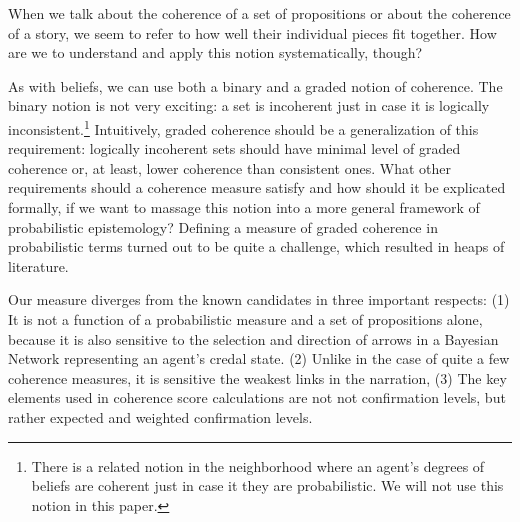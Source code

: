 \documentclass[10pt,]{scrartcl}
\begin{document}

When we talk about the coherence of a set of propositions or about the
coherence of a story, we seem to refer to how well their individual
pieces fit together. How are we to understand and apply this notion
systematically, though?

As with beliefs, we can use both a binary and a graded notion of
coherence. The binary notion is not very exciting: a set is incoherent
just in case it is logically
inconsistent.\footnote{There is a related notion in the neighborhood where an agent's  degrees of beliefs are coherent just in case it they are probabilistic. We will not use this notion in this paper.}
Intuitively, graded coherence should be a generalization of this
requirement: logically incoherent sets should have minimal level of graded coherence or, at least, lower coherence than
consistent ones. What other requirements should a coherence measure
satisfy and how should it be explicated formally, if we want to massage
this notion into a more general framework of probabilistic epistemology?
Defining a measure of graded coherence in probabilistic terms turned out
to be quite a challenge, which resulted in heaps of literature.



Our measure diverges from the known candidates in three important
respects: (1) It is not a function of a probabilistic measure and a set
of propositions alone, because it is also sensitive to the selection and
direction of arrows in a Bayesian Network representing an agent's credal state. (2) Unlike in the case of quite a few coherence measures, it is  sensitive
 the  weakest links in the narration,
(3) The key elements used in coherence score calculations are not  not confirmation levels, but rather
expected and weighted confirmation levels.
\end{document}
